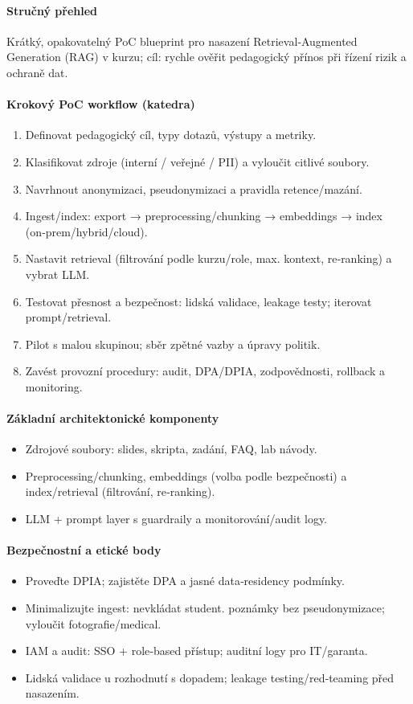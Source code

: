 \paragraph{Stručný přehled} Krátký, opakovatelný PoC blueprint pro nasazení Retrieval‑Augmented Generation (RAG) v kurzu; cíl: rychle ověřit pedagogický přínos při řízení rizik a ochraně dat.

\paragraph{Krokový PoC workflow (katedra)} \begin{enumerate}
  \item Definovat pedagogický cíl, typy dotazů, výstupy a metriky.
  \item Klasifikovat zdroje (interní / veřejné / PII) a vyloučit citlivé soubory.
  \item Navrhnout anonymizaci, pseudonymizaci a pravidla retence/mazání.
  \item Ingest/index: export → preprocessing/chunking → embeddings → index (on‑prem/hybrid/cloud).
  \item Nastavit retrieval (filtrování podle kurzu/role, max. kontext, re‑ranking) a vybrat LLM.
  \item Testovat přesnost a bezpečnost: lidská validace, leakage testy; iterovat prompt/retrieval.
  \item Pilot s malou skupinou; sběr zpětné vazby a úpravy politik.
  \item Zavést provozní procedury: audit, DPA/DPIA, zodpovědnosti, rollback a monitoring.
\end{enumerate}

\paragraph{Základní architektonické komponenty} \begin{itemize}
  \item Zdrojové soubory: slides, skripta, zadání, FAQ, lab návody.
  \item Preprocessing/chunking, embeddings (volba podle bezpečnosti) a index/retrieval (filtrování, re‑ranking).
  \item LLM + prompt layer s guardraily a monitorování/audit logy.
\end{itemize}

\paragraph{Bezpečnostní a etické body} \begin{itemize}
  \item Proveďte DPIA; zajistěte DPA a jasné data‑residency podmínky.
  \item Minimalizujte ingest: nevkládat student. poznámky bez pseudonymizace; vyloučit fotografie/medical.
  \item IAM a audit: SSO + role‑based přístup; auditní logy pro IT/garanta.
  \item Lidská validace u rozhodnutí s dopadem; leakage testing/red‑teaming před nasazením.
\end{itemize}

